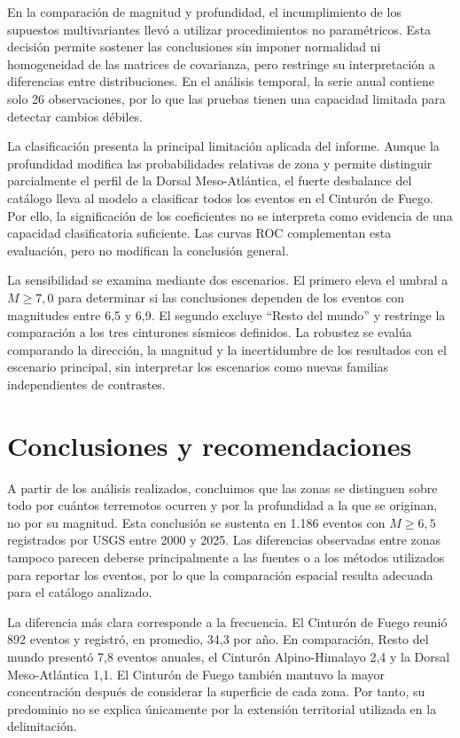 \documentclass[
  spanish,
  letterpaper,
  DIV=11,
  numbers=noendperiod]{scrartcl}
\begin{document}
En la comparación de magnitud y profundidad, el incumplimiento de los
supuestos multivariantes llevó a utilizar procedimientos no
paramétricos. Esta decisión permite sostener las conclusiones sin
imponer normalidad ni homogeneidad de las matrices de covarianza, pero
restringe su interpretación a diferencias entre distribuciones. En el
análisis temporal, la serie anual contiene solo 26 observaciones, por lo
que las pruebas tienen una capacidad limitada para detectar cambios
débiles.

La clasificación presenta la principal limitación aplicada del informe.
Aunque la profundidad modifica las probabilidades relativas de zona y
permite distinguir parcialmente el perfil de la Dorsal Meso-Atlántica,
el fuerte desbalance del catálogo lleva al modelo a clasificar todos los
eventos en el Cinturón de Fuego. Por ello, la significación de los
coeficientes no se interpreta como evidencia de una capacidad
clasificatoria suficiente. Las curvas ROC complementan esta evaluación,
pero no modifican la conclusión general.

La sensibilidad se examina mediante dos escenarios. El primero eleva el
umbral a \(M \geq 7{,}0\) para determinar si las conclusiones dependen
de los eventos con magnitudes entre 6,5 y 6,9. El segundo excluye
``Resto del mundo'' y restringe la comparación a los tres cinturones
sísmicos definidos. La robustez se evalúa comparando la dirección, la
magnitud y la incertidumbre de los resultados con el escenario
principal, sin interpretar los escenarios como nuevas familias
independientes de contrastes.

\newpage

\section{Conclusiones y
recomendaciones}\label{conclusiones-y-recomendaciones}

A partir de los análisis realizados, concluimos que las zonas se
distinguen sobre todo por cuántos terremotos ocurren y por la
profundidad a la que se originan, no por su magnitud. Esta conclusión se
sustenta en 1.186 eventos con \(M \geq 6{,}5\) registrados por USGS
entre 2000 y 2025. Las diferencias observadas entre zonas tampoco
parecen deberse principalmente a las fuentes o a los métodos utilizados
para reportar los eventos, por lo que la comparación espacial resulta
adecuada para el catálogo analizado.

La diferencia más clara corresponde a la frecuencia. El Cinturón de
Fuego reunió 892 eventos y registró, en promedio, 34,3 por año. En
comparación, Resto del mundo presentó 7,8 eventos anuales, el Cinturón
Alpino-Himalayo 2,4 y la Dorsal Meso-Atlántica 1,1. El Cinturón de Fuego
también mantuvo la mayor concentración después de considerar la
superficie de cada zona. Por tanto, su predominio no se explica
únicamente por la extensión territorial utilizada en la delimitación.
\end{document}
